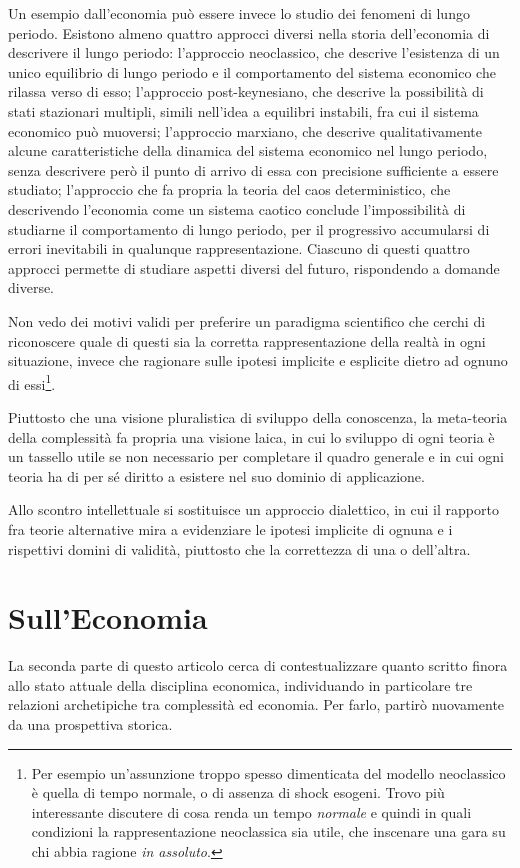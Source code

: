 \documentclass[a4paper, headings=standardclasses]{scrartcl}
\begin{document}
Un esempio dall'economia può essere invece lo studio dei fenomeni di lungo periodo.
Esistono almeno quattro approcci diversi nella storia dell'economia di descrivere il lungo periodo: l'approccio neoclassico, che descrive l'esistenza di un unico equilibrio di lungo periodo e il comportamento del sistema economico che rilassa verso di esso; l'approccio post-keynesiano, che descrive la possibilità di stati stazionari multipli, simili nell'idea a equilibri instabili, fra cui il sistema economico può muoversi; l'approccio marxiano, che descrive qualitativamente alcune caratteristiche della dinamica del sistema economico nel lungo periodo, senza descrivere però il punto di arrivo di essa con precisione sufficiente a essere studiato; l'approccio che fa propria la teoria del caos deterministico, che descrivendo l'economia come un sistema caotico conclude l'impossibilità di studiarne il comportamento di lungo periodo, per il progressivo accumularsi di errori inevitabili in qualunque rappresentazione.
Ciascuno di questi quattro approcci permette di studiare aspetti diversi del futuro, rispondendo a domande diverse.

Non vedo dei motivi validi per preferire un paradigma scientifico che cerchi di riconoscere quale di questi sia la corretta rappresentazione della realtà in ogni situazione, invece che ragionare sulle ipotesi implicite e esplicite dietro ad ognuno di essi\footnote{Per esempio un'assunzione troppo spesso dimenticata del modello neoclassico è quella di tempo normale, o di assenza di shock esogeni. Trovo più interessante discutere di cosa renda un tempo \textit{normale} e quindi in quali condizioni la rappresentazione neoclassica sia utile, che inscenare una gara su chi abbia ragione \textit{in assoluto}.}.

Piuttosto che una visione pluralistica di sviluppo della conoscenza, la meta-teoria della complessità fa propria una visione laica, in cui lo sviluppo di ogni teoria è un tassello utile se non necessario per completare il quadro generale e in cui ogni teoria ha di per sé diritto a esistere nel suo dominio di applicazione.

Allo scontro intellettuale si sostituisce un approccio dialettico, in cui il rapporto fra teorie alternative mira a evidenziare le ipotesi implicite di ognuna e i rispettivi domini di validità, piuttosto che la correttezza di una o dell'altra.

\section{Sull'Economia}
La seconda parte di questo articolo cerca di contestualizzare quanto scritto finora allo stato attuale della disciplina economica, individuando in particolare tre relazioni archetipiche
tra complessità ed economia.
Per farlo, partirò nuovamente da una prospettiva storica.
\end{document}
